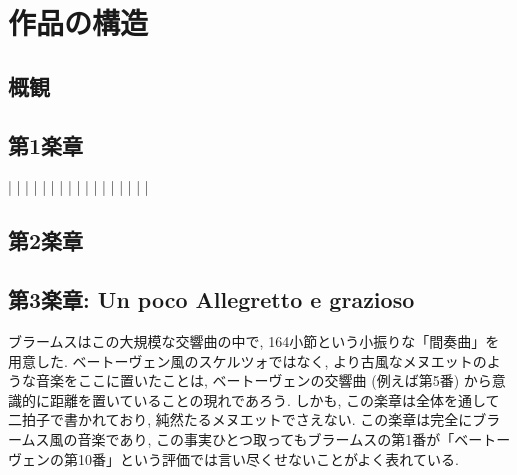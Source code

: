 
\chapter{作品の構造}

\section{概観}

\section{第1楽章}

\musicbegin
	\systemnumbers
	\def\writebarno{\llap{\the\barno\barnoadd}}%
	\def\raisebarno{2\internote}%
	\def\shiftbarno{1.3\Interligne}%
	\def\nbinstruments{1}%
	\startextract%
		\notes{}\ds\ds|\ds\ds{}\enotes
		\Notes{}|\enotes
		\notes|\enotes
		\bar
		\NOTes{}|\enotes
		\Notes{}|\enotes
		\Notes|\enotes
		\bar
		\Notes{}|\ds\enotes
		\Notes{}|\enotes
		\bar
		\notes{}\ds|\enotes
		\notes\ds|\enotes
		\Notes\qp|\enotes
		\notes{}|\enotes
		\bar
		\notes{}\ds|\ds\enotes
	\zendextract %



\section{第2楽章}

\section{第3楽章: Un poco Allegretto e grazioso}

ブラームスはこの大規模な交響曲の中で, 164小節という小振りな「間奏曲」を用意した.
ベートーヴェン風のスケルツォではなく, より古風なメヌエットのような音楽をここに置いたことは,
ベートーヴェンの交響曲 (例えば第5番) から意識的に距離を置いていることの現れであろう.
しかも, この楽章は全体を通して二拍子で書かれており, 純然たるメヌエットでさえない.
この楽章は完全にブラームス風の音楽であり, この事実ひとつ取ってもブラームスの第1番が「ベートーヴェンの第10番」という評価では言い尽くせないことがよく表れている.

